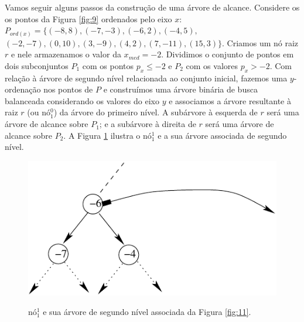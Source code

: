 Vamos seguir alguns passos da construção de uma árvore de alcance. Considere os os pontos da Figura \ref{fig:9} ordenados pelo eixo $x$: $P_{ord(x)} = \{(-8,8), (-7, -3), (-6, 2), (-4,5),$ $(-2,-7),(0,10), (3,-9), (4,2), (7,-11), (15,3)\}$. Criamos um nó raiz $r$ e nele armazenamos o valor da $x_{med} = -2$. Dividimos o conjunto de pontos em dois subconjuntos $P_1$ com os pontos $p_x\leq -2$ e $P_2$ com os valores $p_x > -2$.
Com relação à árvore de segundo nível relacionada ao conjunto inicial, fazemos uma $y$-ordenação nos pontos de $P$ e construímos uma árvore binária de busca balanceada considerando os valores do eixo $y$ e associamos a árvore resultante à raiz $r$ (ou nó$^0_1$) da árvore do primeiro nível. A subárvore à esquerda de $r$ será uma árvore de alcance sobre $P_1$; e a subárvore à direita de $r$ será uma árvore de alcance sobre $P_2$.
A Figura \ref{fig:10} ilustra o nó$^1_1$ e a sua árvore associada de segundo nível.
\begin{figure}[h!]

\centering
\begin{minipage}{.5\textwidth}
  \centering
  \includegraphics[width=.8\linewidth]{images/range_tree3.pdf}

  \label{fig:test1}
\end{minipage}%
\begin{minipage}{.5\textwidth}
  \centering
  
  \label{fig:test2}
 
\end{minipage}
 \caption{nó$^1_1$ e sua árvore de segundo nível associada da Figura \ref{fig:11}.}
 \label{fig:10}
\end{figure}

